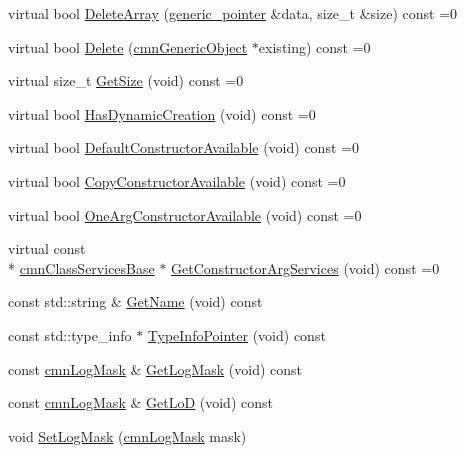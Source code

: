 \begin{DoxyCompactItemize}
\item 
virtual bool \hyperlink{classcmn_class_services_base_a064f40c7b44083e6dde4dab73705a13b}{Delete\-Array} (\hyperlink{classcmn_class_services_base_a859cb10b40a79b083c9ba0cae0d52afd}{generic\-\_\-pointer} \&data, size\-\_\-t \&size) const =0
\item 
virtual bool \hyperlink{classcmn_class_services_base_ad114ec7ebb4ca20987a40fe3de671420}{Delete} (\hyperlink{classcmn_generic_object}{cmn\-Generic\-Object} $\ast$existing) const =0
\item 
virtual size\-\_\-t \hyperlink{classcmn_class_services_base_a5f84c2e034081d247d11429ccea17cf8}{Get\-Size} (void) const =0
\item 
virtual bool \hyperlink{classcmn_class_services_base_ad7efca19b748d8405cf0a0b485e8b371}{Has\-Dynamic\-Creation} (void) const =0
\item 
virtual bool \hyperlink{classcmn_class_services_base_a031919fb27ef1fd50b68ec2c8b1870ac}{Default\-Constructor\-Available} (void) const =0
\item 
virtual bool \hyperlink{classcmn_class_services_base_a23cfad31fa8f863a05866b2bd13967e9}{Copy\-Constructor\-Available} (void) const =0
\item 
virtual bool \hyperlink{classcmn_class_services_base_a57f4ce8f78268ca150c1cf251555f026}{One\-Arg\-Constructor\-Available} (void) const =0
\item 
virtual const \\*
\hyperlink{classcmn_class_services_base}{cmn\-Class\-Services\-Base} $\ast$ \hyperlink{classcmn_class_services_base_ac4ba1d3ecd54ccfa2aa30f0a80d296df}{Get\-Constructor\-Arg\-Services} (void) const =0
\item 
const std\-::string \& \hyperlink{classcmn_class_services_base_a45478b7cf3deb0ce224821cd0669ce29}{Get\-Name} (void) const 
\item 
const std\-::type\-\_\-info $\ast$ \hyperlink{classcmn_class_services_base_a92f4d8a44cc760bd73e0371b2ca33157}{Type\-Info\-Pointer} (void) const 
\item 
const \hyperlink{cmn_log_lo_d_8h_a44b6ef7560b0d204460b0a54f1a5d702}{cmn\-Log\-Mask} \& \hyperlink{classcmn_class_services_base_a4bdade65dff5b54cc32f02023f031955}{Get\-Log\-Mask} (void) const 
\item 
const \hyperlink{cmn_log_lo_d_8h_a44b6ef7560b0d204460b0a54f1a5d702}{cmn\-Log\-Mask} \& \hyperlink{classcmn_class_services_base_acab983d9c0ba61c62587ca2ba71fee5b}{Get\-Lo\-D} (void) const 
\item 
void \hyperlink{classcmn_class_services_base_a18cf2a5cfc3915a580be3aaebedaa73e}{Set\-Log\-Mask} (\hyperlink{cmn_log_lo_d_8h_a44b6ef7560b0d204460b0a54f1a5d702}{cmn\-Log\-Mask} mask)

\end{DoxyCompactItemize}

